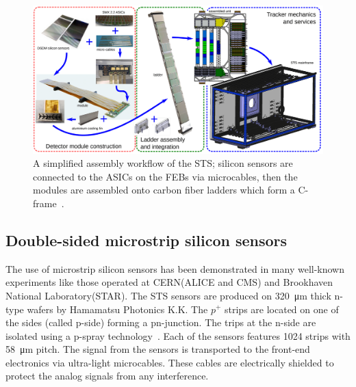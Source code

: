 \newpage
\begin{figure}[!h]
\centering
\includegraphics[width=1\columnwidth]{Chapter2/images/assembly_sequence.png}
\caption{A simplified assembly workflow of the \gls{STS}; silicon sensors are connected to the ASICs on the \glspl{FEB} via microcables, then the modules are assembled onto carbon fiber ladders which form a C-frame~\cite{Teklishyn}.}
\label{fig_assembly}
\end{figure}






\subsection{Double-sided microstrip silicon sensors}
\label{sensors}

The use of microstrip silicon sensors has been demonstrated in many well-known experiments like those operated at \gls{CERN}(\gls{ALICE} and \gls{CMS}) and Brookhaven National Laboratory(\gls{STAR}). The \gls{STS} sensors are produced on \SI{320}{\micro\metre} thick n-type wafers by Hamamatsu Photonics K.K. The $p^{+}$ strips are located on one of the sides (called p-side) forming a pn-junction. The trips at the n-side are isolated using a p-spray technology~\cite{Heuser:54798}. Each of the sensors features 1024 strips with \SI{58}{\micro\metre} pitch. The signal from the sensors is transported to the front-end electronics via ultra-light microcables. These cables are electrically shielded to protect the analog signals from any interference. 

